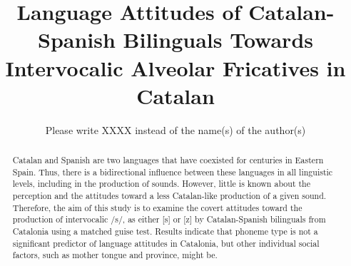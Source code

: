 \title{Language Attitudes of Catalan-Spanish Bilinguals Towards Intervocalic Alveolar Fricatives in Catalan}
\author{Please write XXXX instead of the name(s) of the author(s)}


\maketitle

\begin{abstract}
Catalan and Spanish are two languages that have coexisted for centuries in Eastern Spain. Thus, there is a bidirectional influence between these languages in all linguistic levels, including in the production of sounds. However, little is known about the perception and the attitudes toward a less Catalan-like production of a given sound. Therefore, the aim of this study is to examine the covert attitudes toward the production of intervocalic /s/, as either [s] or [z] by Catalan-Spanish bilinguals from Catalonia using a matched guise test. Results indicate that phoneme type is not a significant predictor of language attitudes in Catalonia, but other individual social factors, such as mother tongue and province, might be.
\end{abstract}


